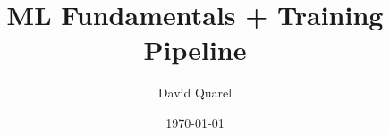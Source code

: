 \providecommand{\HANDOUT}{1}


\newcommand{\R}{\mathbb{R}}



\title[Day 1: ML Fundamentals + Training Pipeline]
{{ML Fundamentals + Training Pipeline}}

\author[David Quarel]
{David Quarel}


\date[\today]
{\today}

\frame{\titlepage}


